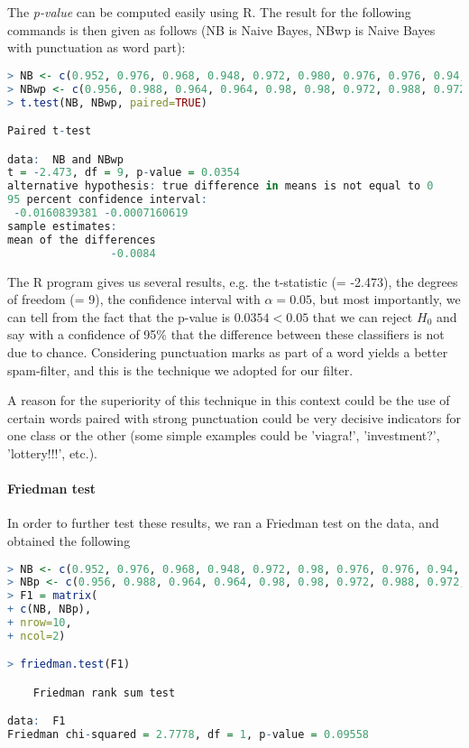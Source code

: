 \documentclass[12pt,a4paper]{report}
\begin{document}
The \textit{p-value} can be computed easily using R. The result for the following commands is then given as follows (NB is Naive Bayes, NBwp is Naive Bayes with punctuation as word part):

\begin{lstlisting}[language=R]
> NB <- c(0.952, 0.976, 0.968, 0.948, 0.972, 0.980, 0.976, 0.976, 0.94, 0.932)
> NBwp <- c(0.956, 0.988, 0.964, 0.964, 0.98, 0.98, 0.972, 0.988, 0.972, 0.94)
> t.test(NB, NBwp, paired=TRUE)

Paired t-test

data:  NB and NBwp
t = -2.473, df = 9, p-value = 0.0354
alternative hypothesis: true difference in means is not equal to 0
95 percent confidence interval:
 -0.0160839381 -0.0007160619
sample estimates:
mean of the differences 
                -0.0084

\end{lstlisting}

The R program gives us several results, e.g. the t-statistic (= -2.473), the degrees of freedom (= 9), the confidence interval with $\alpha = 0.05$, but most importantly, we can tell from the fact that the p-value is $0.0354 < 0.05$ that we can reject $H_0$ and say with a confidence of 95\% that the difference between these classifiers is not due to chance. Considering punctuation marks as part of a word yields a better spam-filter, and this is the technique we adopted for our filter.

A reason for the superiority of this technique in this context could be the use of certain words paired with strong punctuation could be very decisive indicators for one class or the other (some simple examples could be 'viagra!', 'investment?', 'lottery!!!', etc.).

\paragraph*{Friedman test}
In order to further test these results, we ran a Friedman test on the data, and obtained the following 

\begin{lstlisting}[language=R]
> NB <- c(0.952, 0.976, 0.968, 0.948, 0.972, 0.98, 0.976, 0.976, 0.94, 0.932)
> NBp <- c(0.956, 0.988, 0.964, 0.964, 0.98, 0.98, 0.972, 0.988, 0.972, 0.94)
> F1 = matrix(
+ c(NB, NBp),
+ nrow=10,
+ ncol=2)

> friedman.test(F1)

	Friedman rank sum test

data:  F1
Friedman chi-squared = 2.7778, df = 1, p-value = 0.09558
\end{lstlisting}
\end{document}
